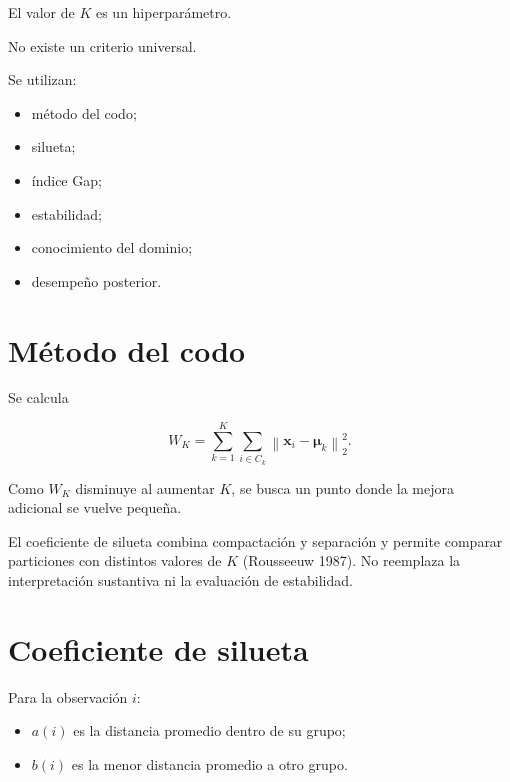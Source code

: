 \documentclass[
  spanish,
  10.5pt,
  letterpaper,
  DIV=11,
  numbers=noendperiod,
  oneside,
  open=any]{scrreprt}
\providecommand{\tightlist}{%
  \setlength{\itemsep}{0pt}\setlength{\parskip}{0pt}}
\theoremstyle{definition}
\theoremstyle{definition}
\theoremstyle{plain}
\theoremstyle{remark}
\begin{document}

El valor de \(K\) es un hiperparámetro.

No existe un criterio universal.

Se utilizan:

\begin{itemize}
\tightlist
\item
  método del codo;
\item
  silueta;
\item
  índice Gap;
\item
  estabilidad;
\item
  conocimiento del dominio;
\item
  desempeño posterior.
\end{itemize}

\section*{Método del codo}\label{muxe9todo-del-codo}


Se calcula

\[
W_K
=
\sum_{k=1}^{K}
\sum_{i\in C_k}
\left\|
\mathbf{x}_i-\boldsymbol{\mu}_k
\right\|_2^2.
\]

Como \(W_K\) disminuye al aumentar \(K\), se busca un punto donde la
mejora adicional se vuelve pequeña.

El coeficiente de silueta combina compactación y separación y permite
comparar particiones con distintos valores de \(K\) (Rousseeuw 1987). No
reemplaza la interpretación sustantiva ni la evaluación de estabilidad.

\section*{Coeficiente de silueta}\label{coeficiente-de-silueta}


Para la observación \(i\):

\begin{itemize}
\tightlist
\item
  \(a(i)\) es la distancia promedio dentro de su grupo;
\item
  \(b(i)\) es la menor distancia promedio a otro grupo.
\end{itemize}
\end{document}
